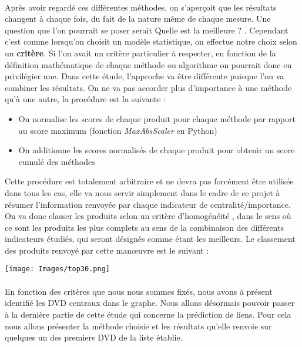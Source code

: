 \documentclass[14pt, openany]{article}
\begin{document}
\paragraph{}
Après avoir regardé ces différentes méthodes, on s'aperçoit que les résultats changent à chaque fois, du fait de la nature même de chaque mesure. Une question que l'on pourrait se poser serait \og Quelle est la meilleure ? \fg{}. Cependant c'est comme lorsqu'on choisit un modèle statistique, on effectue notre choix selon un \textbf{critère}. Si l'on avait un critère particulier à respecter, en fonction de la définition mathématique de chaque méthode ou algorithme on pourrait donc en privilégier une. Dans cette étude, l'approche va être différente puisque l'on va combiner les résultats. On ne va pas accorder plus d'importance à une méthode qu'à une autre, la procédure est la suivante :
\begin{itemize}
\item On normalise les scores de chaque produit pour chaque méthode par rapport au score maximum (fonction \textit{MaxAbsScaler} en Python)
\item On additionne les scores normalisés de chaque produit pour obtenir un score cumulé des méthodes
\end{itemize}
Cette procédure est totalement arbitraire et ne devra pas forcément être utilisée dans tous les cas, elle va nous servir simplement dans le cadre de ce projet à résumer l'information renvoyée par chaque indicateur de centralité/importance. On va donc classer les produits selon un critère \og d'homogénéité \fg{}, dans le sens où ce sont les produits les plus \og complets \fg{} au sens de la combinaison des différents indicateurs étudiés, qui seront désignés comme étant les meilleurs.
\newpage
Le classement des produits renvoyé par cette manœuvre est le suivant :
\begin{center}
\texttt{[image: Images/top30.png]}
\label{fig1}
\end{center}
\paragraph{}
En fonction des critères que nous nous sommes fixés, nous avons à présent identifié les DVD centraux dans le graphe. Nous allons désormais pouvoir passer à la dernière partie de cette étude qui concerne la prédiction de liens. Pour cela nous allons présenter la méthode choisie et les résultats qu'elle renvoie sur quelques un des premiers DVD de la liste établie.
\end{document}

